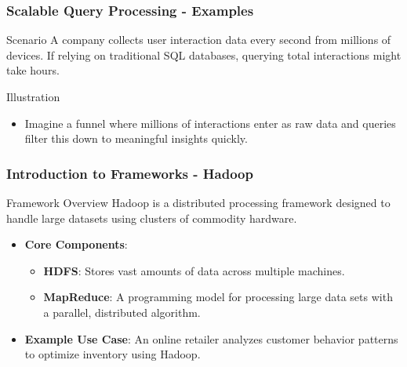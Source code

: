 \documentclass[aspectratio=169]{beamer}
\begin{document}
\begin{frame}[fragile]
    \frametitle{Scalable Query Processing - Examples}
    \begin{block}{Scenario}
        A company collects user interaction data every second from millions of devices. If relying on traditional SQL databases, querying total interactions might take hours.
    \end{block}
    
    \begin{block}{Illustration}
        \begin{itemize}
            \item Imagine a funnel where millions of interactions enter as raw data and queries filter this down to meaningful insights quickly.
        \end{itemize}
    \end{block}
\end{frame}

\begin{frame}[fragile]
    \frametitle{Introduction to Frameworks - Hadoop}
    \begin{block}{Framework Overview}
        Hadoop is a distributed processing framework designed to handle large datasets using clusters of commodity hardware.
    \end{block}
    
    \begin{itemize}
        \item \textbf{Core Components}:
              \begin{itemize}
                  \item \textbf{HDFS}: Stores vast amounts of data across multiple machines.
                  \item \textbf{MapReduce}: A programming model for processing large data sets with a parallel, distributed algorithm.
              \end{itemize}
        \item \textbf{Example Use Case}: 
              An online retailer analyzes customer behavior patterns to optimize inventory using Hadoop.
    \end{itemize}
\end{frame}
\end{document}

